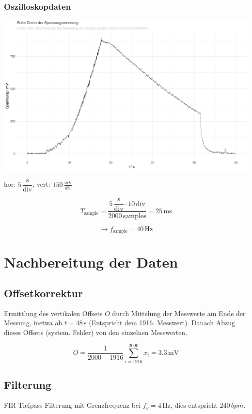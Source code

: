 \documentclass{article}
\begin{document}
\subsubsection{Oszilloskopdaten}

\includegraphics[width=\textwidth]{graphics/raw_data.pdf}

hor: $5 \, \dfrac{\si{\second}}{\text{div}}$, vert: $150 \, \frac{\si{\milli\volt}}{\si{div}}$


\[ T_{\text{sample}} = \frac{5 \, \dfrac{\si{\second}}{\text{div}} \cdot 10 \, \text{div}}{2000 \, \text{samples}} = 25 \, \si{\milli\second}\]

\[\rightarrow f_{\text{sample}} = 40 \, \si{\hertz}\]

\section{Nachbereitung der Daten}

\subsection{Offsetkorrektur}
Ermittlung des vertikalen Offsets $O$ durch Mittelung der Messwerte am Ende der Messung, inetwa ab $t = 48 \, \si{\second}$ (Entspricht dem 1916. Messwert). Danach Abzug dieses Offsets (system. Fehler) von den einzelnen Messwerten.

\[O = \frac{1}{2000 - 1916} \sum^{2000}_{i=1916}{x_{i}} = 3.3 \, \si{\milli\volt}\]

\subsection{Filterung}
FIR-Tiefpass-Filterung mit Grenzfrequenz bei $f_{g} = 4 \, \si{\hertz}$, dies entspricht $240 \, \si{bpm}$.
\end{document}
